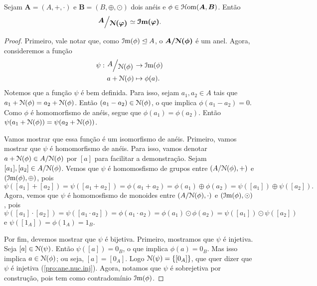 \begin{teo}
\label{teo:iso1}
	Sejam $\bm A=(A,+,\cdot)$ e $\bm B=(B,\oplus,\odot)$ dois anéis e $\phi \in \mathcal{H}\mathrm{om}(\bm A,\bm B)$. Então
	\begin{equation*}
	\bm{\quo{A}{\nuc(\varphi)}} \simeq \bm{\im(\varphi)}.
	\end{equation*}
\end{teo}
\begin{proof}
	Primeiro, vale notar que, como $\mathcal{I}\mathrm{m}(\phi) \mathrel{\unlhd} A$, o $\bm{A/\mathcal{N}(\phi)}$ é um anel. Agora, consideremos a função
	\begin{align*}
	\psi: \quo{A}{\nuc(\phi)} &\to \im(\phi) \\
		a+\nuc(\phi) &\mapsto \phi(a).
	\end{align*}
Notemos que a função $\psi$ é bem definida. Para isso, sejam $a_1,a_2 \in A$ tais que $a_1+\mathcal{N}(\phi)=a_2+\mathcal{N}(\phi)$. Então $(a_1-a_2) \in \mathcal{N}(\phi)$, o que implica $\phi(a_1-a_2)=0$. Como $\phi$ é homomorfismo de anéis, segue que $\phi(a_1)=\phi(a_2)$. Então $\psi(a_1+\mathcal{N}(\phi)) = \psi(a_2+\mathcal{N}(\phi))$.

	Vamos mostrar que essa função é um isomorfismo de anéis. Primeiro, vamos mostrar que $\psi$ é homomorfismo de anéis. Para isso, vamos denotar $a+\mathcal{N}(\phi) \in A/\mathcal{N}(\phi)$ por $[a]$ para facilitar a demonstração. Sejam $[a_1],[a_2] \in A/\mathcal{N}(\phi)$. Vemos que $\psi$ é homomosfismo de grupos entre $(A/\mathcal{N}(\phi),+)$ e $(\mathcal{I}\mathrm{m}(\phi),\oplus)$, pois
	\begin{equation*}
	\psi([a_1]+[a_2]) = \psi([a_1+a_2]) = \phi(a_1+a_2) = \phi(a_1) \oplus \phi(a_2) = \psi([a_1]) \oplus \psi([a_2]).
	\end{equation*}
Agora, vemos que $\psi$ é homomosfismo de monoides entre $(A/\mathcal{N}(\phi),\cdot)$ e $(\mathcal{I}\mathrm{m}(\phi),\odot)$, pois
	\begin{equation*}
	\psi([a_1] \cdot [a_2]) = \psi([a_1 \cdot a_2]) = \phi(a_1 \cdot a_2) = \phi(a_1) \odot \phi(a_2) = \psi([a_1]) \odot \psi([a_2])
	\end{equation*}
e $\psi([1_A]) = \phi(1_A) = 1_B$.

	Por fim, devemos mostrar que $\psi$ é bijetiva. Primeiro, mostramos que $\psi$ é injetiva. Seja $[a] \in \mathcal{N}(\psi)$. Então $\psi([a])=0_B$, o que implica $\phi(a)=0_B$. Mas isso implica $a \in \mathcal{N}(\phi)$; ou seja, $[a]=[0_A]$. Logo $\mathcal{N}(\psi)=\{[0_A]\}$, que quer dizer que $\psi$ é injetiva (\ref{pro:ane.nuc.inj}). Agora, notamos que $\psi$ é sobrejetiva por construção, pois tem como contradomínio $\mathcal{I}\mathrm{m}(\phi)$.
\end{proof}

